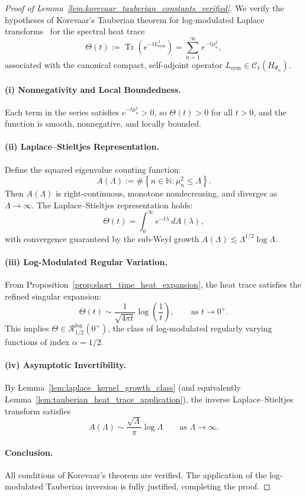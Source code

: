 \begin{proof}[Proof of Lemma~\ref{lem:korevaar_tauberian_constants_verified}]
We verify the hypotheses of Korevaar’s Tauberian theorem for log-modulated Laplace transforms~\cite[Ch.~III, Thm.~5.5]{Korevaar2004Tauberian} for the spectral heat trace
\[
\Theta(t) := \operatorname{Tr}(e^{-t L_{\mathrm{sym}}^2}) = \sum_{n=1}^\infty e^{-t \mu_n^2},
\]
associated with the canonical compact, self-adjoint operator \( L_{\mathrm{sym}} \in \mathcal{C}_1(H_{\Psi_\alpha}) \).

\paragraph{(i) Nonnegativity and Local Boundedness.}
Each term in the series satisfies \( e^{-t \mu_n^2} > 0 \), so \( \Theta(t) > 0 \) for all \( t > 0 \), and the function is smooth, nonnegative, and locally bounded.

\paragraph{(ii) Laplace–Stieltjes Representation.}
Define the squared eigenvalue counting function:
\[
A(\Lambda) := \#\left\{ n \in \mathbb{N} : \mu_n^2 \le \Lambda \right\}.
\]
Then \( A(\Lambda) \) is right-continuous, monotone nondecreasing, and diverges as \( \Lambda \to \infty \). The Laplace–Stieltjes representation holds:
\[
\Theta(t) = \int_0^\infty e^{-t \lambda} \, dA(\lambda),
\]
with convergence guaranteed by the sub-Weyl growth \( A(\Lambda) \lesssim \Lambda^{1/2} \log \Lambda \).

\paragraph{(iii) Log-Modulated Regular Variation.}
From Proposition~\ref{prop:short_time_heat_expansion}, the heat trace satisfies the refined singular expansion:
\[
\Theta(t) \sim \frac{1}{\sqrt{4\pi t}} \log\left( \frac{1}{t} \right), \qquad \text{as } t \to 0^+.
\]
This implies \( \Theta \in \mathcal{R}^{\log}_{1/2}(0^+) \), the class of log-modulated regularly varying functions of index \( \alpha = 1/2 \).

\paragraph{(iv) Asymptotic Invertibility.}
By Lemma~\ref{lem:laplace_kernel_growth_class} (and equivalently Lemma~\ref{lem:tauberian_heat_trace_application}), the inverse Laplace–Stieltjes transform satisfies
\[
A(\Lambda) \sim \frac{\sqrt{\Lambda}}{\pi} \log \Lambda \qquad \text{as } \Lambda \to \infty.
\]

\paragraph{Conclusion.}
All conditions of Korevaar’s theorem are verified. The application of the log-modulated Tauberian inversion is fully justified, completing the proof.
\end{proof}
